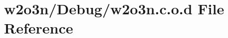 \hypertarget{w2o3n_8c_8o_8d}{}\section{w2o3n/\+Debug/w2o3n.c.\+o.\+d File Reference}
\label{w2o3n_8c_8o_8d}
